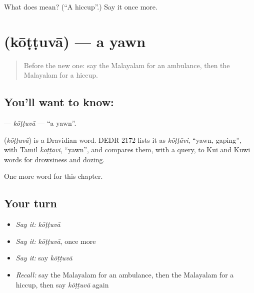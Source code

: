\begin{tcolorbox}[breakable,colback=teal!4,colframe=teal!35!black,title={Before you move on}]
What does  mean? (\textquotedblleft{}A hiccup\textquotedblright{}.) Say it once more.
\end{tcolorbox}
\section[\texorpdfstring{\ml{കോട്ടുവാ} (kōṭṭuvā)}{കോട്ടുവാ (kōṭṭuvā)}]{ (kōṭṭuvā) — a yawn}

\label{lesson:ML-C313-kottuva}



\begin{quote}
Before the new one: say the Malayalam for an ambulance, then the Malayalam for a hiccup.
\end{quote}

\subsection*{You'll want to know: }
\textbf{} — \emph{kōṭṭuvā} — \textquotedblleft{}a yawn\textquotedblright{}.

\begin{cousinweb}
\textbf{} (\emph{kōṭṭuvā}) is a Dravidian word. DEDR 2172 lists it as \emph{kōṭṭāvi}, \textquotedblleft{}yawn, gaping\textquotedblright{}, with Tamil \emph{koṭṭāvi}, \textquotedblleft{}yawn\textquotedblright{}, and compares them, with a query, to Kui and Kuwi words for drowsiness and dozing.
\end{cousinweb}

\begin{grammarlens}[title={What you've built}]
One more word for this chapter.
\end{grammarlens}

\subsection*{Your turn}
\begin{itemize}
\raggedright
  \item \emph{Say it:} \emph{kōṭṭuvā}
  \item \emph{Say it:} \emph{kōṭṭuvā}, once more
  \item \emph{Say it:} say \emph{kōṭṭuvā}
  \item \emph{Recall:} say the Malayalam for an ambulance, then the Malayalam for a hiccup, then say \emph{kōṭṭuvā} again
\end{itemize}

